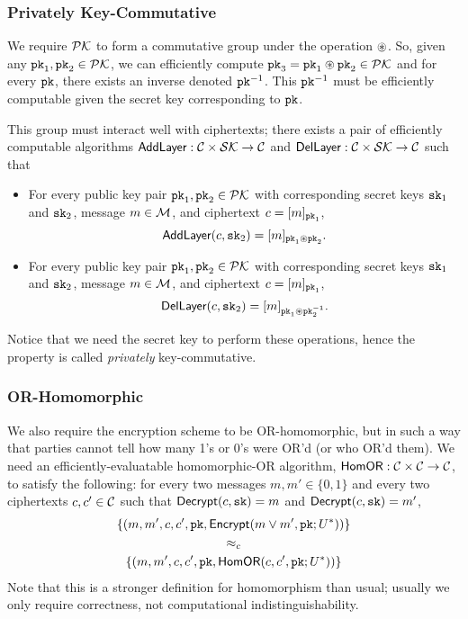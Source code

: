 \subsubsection{Privately Key-Commutative}
We require $\mathcal{PK}$ to form a commutative group under the operation $\circledast$. So, given any $\texttt{pk}_1, \texttt{pk}_2 \in \mathcal{PK}$, we can efficiently compute $\texttt{pk}_3 = \texttt{pk}_1 \circledast \texttt{pk}_2 \in \mathcal{PK}$ and for every $\texttt{pk}$, there exists an inverse denoted $\texttt{pk}^{-1}$. 
This $\texttt{pk}^{-1}$ must be efficiently computable given the secret key corresponding to $\texttt{pk}$.

This group must interact well with ciphertexts; there exists a pair of efficiently computable algorithms $\textsf{AddLayer} : \mathcal{C} \times \mathcal{SK} \to \mathcal{C}$ and $\textsf{DelLayer} : \mathcal{C} \times \mathcal{SK} \to \mathcal{C}$ such that
\begin{itemize}
	\item For every public key pair $\texttt{pk}_1, \texttt{pk}_2 \in \mathcal{PK}$ with corresponding secret keys $\texttt{sk}_1$ and $\texttt{sk}_2$, message $m \in \mathcal{M}$, and ciphertext $c = [m]_{\texttt{pk}_1}$,
	\[\textsf{AddLayer}(c, \texttt{sk}_2) = [m]_{\texttt{pk}_1 \circledast \texttt{pk}_2}.\]
	\item For every public key pair $\texttt{pk}_1, \texttt{pk}_2 \in \mathcal{PK}$ with corresponding secret keys $\texttt{sk}_1$ and $\texttt{sk}_2$, message $m \in \mathcal{M}$, and ciphertext $c = [m]_{\texttt{pk}_1}$,
	\[\textsf{DelLayer}(c, \texttt{sk}_2) = [m]_{\texttt{pk}_1 \circledast \texttt{pk}_2^{-1}}.\]
\end{itemize}
Notice that we need the secret key to perform these operations, hence the property is called \emph{privately} key-commutative.

\subsubsection{OR-Homomorphic}
We also require the encryption scheme to be OR-ho\-mo\-mor\-phic, but in such a way that parties cannot tell how many 1's or 0's were OR'd (or who OR'd them). 
We need an efficiently-evaluatable homomorphic-OR algorithm, $\textsf{HomOR} : \mathcal{C} \times \mathcal{C} \to \mathcal{C}$, to satisfy the following: for every two messages $m, m' \in \{0,1\}$ and every two ciphertexts $c, c' \in \mathcal{C}$ such that $\textsf{Decrypt}(c, \texttt{sk}) = m$ and $\textsf{Decrypt}(c, \texttt{sk}) = m'$,
\begin{gather*}
\left\{ (m,m', c,c', \texttt{pk}, \textsf{Encrypt}(m \lor m', \texttt{pk}; U^*)) \right\} \\
\approx_c \\
\left\{ (m,m', c,c', \texttt{pk}, \textsf{HomOR}(c, c', \texttt{pk}; U^*)) \right\}\\
\end{gather*}
Note that this is a stronger definition for homomorphism than usual; usually we only require correctness, not computational indistinguishability.

